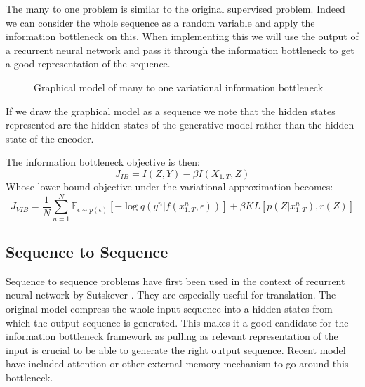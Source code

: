 \documentclass[10pt,oneside,openright]{report}
\begin{document}
The many to one problem is similar to the original supervised problem. Indeed we can consider the whole sequence as a random variable and apply the information bottleneck on this. When implementing this we will use the output of a recurrent neural network and pass it through the information bottleneck to get a good representation of the sequence. 

\begin{figure}[H]
\centering
{}
\caption{Graphical model of many to one variational information bottleneck }
\end{figure}

If we draw the graphical model as a sequence we note that the hidden states represented are the hidden states of the generative model rather than the hidden state of the encoder. 

The information bottleneck objective is then:
$$ J_{IB} = I(Z, Y) - \beta I(X_{1:T}, Z)$$
Whose lower bound objective under the variational approximation becomes:
 $$ J_{VIB} = \frac{1}{N}  \sum_{n=1}^{N} \mathbb{E}_{\epsilon \sim p(\epsilon)}[- \log q(y^{n} |f(x_{1:T}^n, \epsilon))] + \beta KL[p(Z|x_{1:T}^n), r(Z)]$$

\subsection{Sequence to Sequence}
Sequence to sequence problems have first been used in the context of recurrent neural network by Sutskever \cite{s2s}. They are especially useful for translation. The original model compress the whole input sequence into a hidden states from which the output sequence is generated. This makes it a good candidate for the information bottleneck framework as pulling as relevant representation of the input is crucial to be able to generate the right output sequence. Recent model have included attention \cite{attention} or other external memory mechanism to go around this bottleneck.
\end{document}
